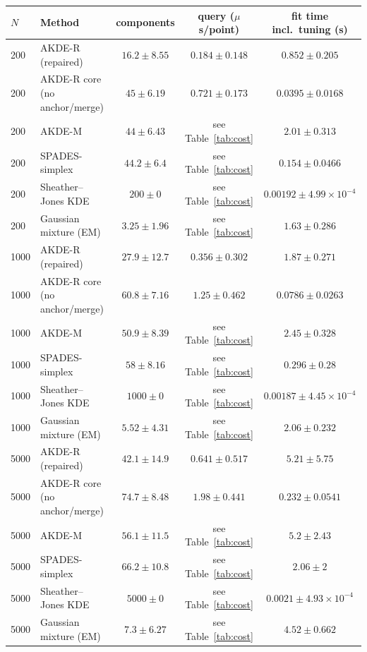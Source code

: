 \begin{tabular}{llccc}
\toprule
$N$ & Method & components & query ($\mu$s/point) & fit time incl.\ tuning (s) \\
\midrule
200 & AKDE-R (repaired) & $16.2 \pm 8.55$ & $0.184 \pm 0.148$ & $0.852 \pm 0.205$ \\
200 & AKDE-R core (no anchor/merge) & $45 \pm 6.19$ & $0.721 \pm 0.173$ & $0.0395 \pm 0.0168$ \\
200 & AKDE-M & $44 \pm 6.43$ & see Table~\ref{tab:cost} & $2.01 \pm 0.313$ \\
200 & SPADES-simplex & $44.2 \pm 6.4$ & see Table~\ref{tab:cost} & $0.154 \pm 0.0466$ \\
200 & Sheather--Jones KDE & $200 \pm 0$ & see Table~\ref{tab:cost} & $0.00192 \pm 4.99\times10^{-4}$ \\
200 & Gaussian mixture (EM) & $3.25 \pm 1.96$ & see Table~\ref{tab:cost} & $1.63 \pm 0.286$ \\
\midrule
1000 & AKDE-R (repaired) & $27.9 \pm 12.7$ & $0.356 \pm 0.302$ & $1.87 \pm 0.271$ \\
1000 & AKDE-R core (no anchor/merge) & $60.8 \pm 7.16$ & $1.25 \pm 0.462$ & $0.0786 \pm 0.0263$ \\
1000 & AKDE-M & $50.9 \pm 8.39$ & see Table~\ref{tab:cost} & $2.45 \pm 0.328$ \\
1000 & SPADES-simplex & $58 \pm 8.16$ & see Table~\ref{tab:cost} & $0.296 \pm 0.28$ \\
1000 & Sheather--Jones KDE & $1000 \pm 0$ & see Table~\ref{tab:cost} & $0.00187 \pm 4.45\times10^{-4}$ \\
1000 & Gaussian mixture (EM) & $5.52 \pm 4.31$ & see Table~\ref{tab:cost} & $2.06 \pm 0.232$ \\
\midrule
5000 & AKDE-R (repaired) & $42.1 \pm 14.9$ & $0.641 \pm 0.517$ & $5.21 \pm 5.75$ \\
5000 & AKDE-R core (no anchor/merge) & $74.7 \pm 8.48$ & $1.98 \pm 0.441$ & $0.232 \pm 0.0541$ \\
5000 & AKDE-M & $56.1 \pm 11.5$ & see Table~\ref{tab:cost} & $5.2 \pm 2.43$ \\
5000 & SPADES-simplex & $66.2 \pm 10.8$ & see Table~\ref{tab:cost} & $2.06 \pm 2$ \\
5000 & Sheather--Jones KDE & $5000 \pm 0$ & see Table~\ref{tab:cost} & $0.0021 \pm 4.93\times10^{-4}$ \\
5000 & Gaussian mixture (EM) & $7.3 \pm 6.27$ & see Table~\ref{tab:cost} & $4.52 \pm 0.662$ \\
\bottomrule
\end{tabular}